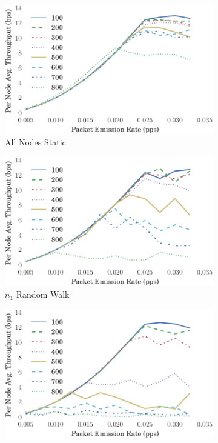 \documentclass[runningheads,a4paper]{llncs}
\begin{document}
\begin{figure}
\begin{subfigure}{.5\textwidth}
  \centering
  \includegraphics[width=.9\linewidth]{img/throughput_sep_lines_static.pdf}
  \caption{All Nodes Static}
  \label{fig:throughput_static}
\end{subfigure}%
\begin{subfigure}{.5\textwidth}
  \centering
  \includegraphics[width=.9\linewidth]{img/throughput_sep_lines_single_mobile.pdf}
  \caption{$n_1$ Random Walk}
  \label{fig:throughput_single_mobile}
\end{subfigure}
\begin{subfigure}{.5\textwidth}
\centering
  \includegraphics[width=.9\linewidth]{img/throughput_sep_lines_allbut1.pdf}

\end{subfigure}
\end{figure}
\end{document}
